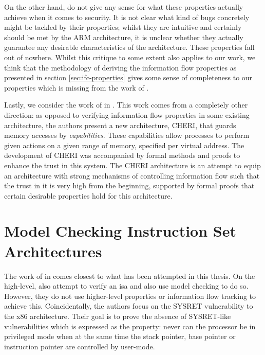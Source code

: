 On the other hand, \citeauthor{KhakpourSD13} do not give any sense for what these properties actually achieve when it comes to security.
It is not clear what kind of bugs concretely might be tackled by their properties; whilst they are intuitive and certainly should be met by the ARM architecture, it is unclear whether they actually guarantee any desirable characteristics of the architecture.
These properties fall out of nowhere.
Whilst this critique to some extent also applies to our work, we think that the methodology of deriving the information flow properties as presented in section \ref{sec:ifc-properties} gives some sense of completeness to our properties which is missing from the work of \citeauthor{KhakpourSD13}.

Lastly, we consider the work of \citeauthor{Nienhuis19} in  \cite{Nienhuis19}.
This work comes from a completely other direction: as opposed to verifying information flow properties in some existing architecture, the authors present a new architecture, CHERI, that guards memory accesses by \textit{capabilities}.
These capabilities allow processes to perform given actions on a given range of memory, specified per virtual address.
The development of CHERI was accompanied by formal methods and proofs to enhance the trust in this system.
The CHERI architecture is an attempt to equip an architecture with strong mechanisms of controlling information flow such that the trust in it is very high from the beginning, supported by formal proofs that certain desirable properties hold for this architecture.

\section{Model Checking Instruction Set Architectures}
\label{sec:related-model-checking}

The work of \citeauthor{BradfieldS16} in  \cite{BradfieldS16} comes closest to what has been attempted in this thesis.
On the high-level, \citeauthor{BradfieldS16} also attempt to verify an \gls{isa} and also use model checking to do so.
However, they do not use higher-level properties or information flow tracking to achieve this.
Coincidentally, the authors focus on the SYSRET vulnerability to the x86 architecture.
Their goal is to prove the absence of SYSRET-like vulnerabilities which is expressed as the property: never can the processor be in privileged mode when at the same time the stack pointer, base pointer or instruction pointer are controlled by user-mode.

